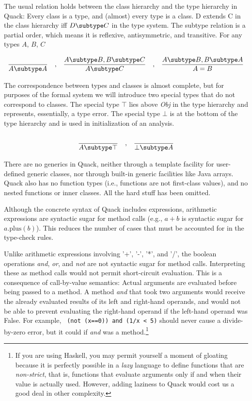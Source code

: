 \documentclass[11pt]{article}
\begin{document}
The usual relation holds between the class hierarchy and the
type hierarchy in Quack:  Every class is a type, and (almost) every type is a
class. D extends C in the class hierarchy iff $D \subtype C$ in the type
system.  The subtype relation is a partial order, which means it is
reflexive, antisymmetric, and transitive.  For any types $A$, $B$, $C$

\[ 
\begin{array}{c@{~~~,~~~}c@{~~~,~~~}c}
 \infrule{}{A \subtype A}  &
 \infrule{A \subtype B, B \subtype C}{A \subtype C}  &
  \infrule{A \subtype B, B \subtype A}{A = B} \\
\end{array}
\]

The correspondence
  between types and classes is almost complete, but for purposes of
  the formal system we will introduce two special types that
  do not correspond to classes.  The special type $\top$ lies 
  above \emph{Obj} in the type hierarchy and represents, essentially,
  a type error.  The special type $\bot$ is at the bottom of the type
  hierarchy and is used in initialization of an analysis.

\[ 
\begin{array}{c@{~~~,~~~}c}
 \infrule{}{A \subtype \top}  &
  \infrule{}{\bot \subtype A}\\
\end{array}
\]


There are no generics in Quack, neither through a template facility
for user-defined generic classes, nor through built-in generic
facilities like Java arrays.  Quack also has no function types (i.e.,
functions are not first-class values), and no nested functions or
inner classes.   All the hard stuff has been omitted. 

Although the concrete syntax of Quack includes expressions, arithmetic
expressions are syntactic sugar for method calls (e.g., $a+b$ is
syntactic sugar for $a.\mbox{plus}(b)$).  This reduces the number of
cases that must be accounted for in the type-check rules.  

Unlike arithmetic expressions involving '+', '-', '*', and '/', 
the boolean operations \emph{and}, \emph{or}, and
\emph{not} are not syntactic sugar for method calls. 
Interpreting these as method calls would not
permit short-circuit evaluation.  This is a consequence of 
call-by-value semantics:  Actual arguments are evaluated before being
passed to a method.   A method \emph{and} that took two arguments
would  receive the already evaluated results of its left and
right-hand operands, and would not be able to prevent evaluating the
right-hand operand if the left-hand operand was False. 
For example, \texttt{ (not (x==0)) and (1/x < 5)} should 
never cause a divide-by-zero error, but it could 
if \emph{and} was a method.\footnote{If you are using Haskell, you may
  permit yourself a moment of gloating because it is perfectly
  possible in a \emph{lazy} language to define functions that are
  \emph{non-strict}, that is, functions that evaluate arguments only
  if and when their value is actually used.  However, adding laziness
  to Quack would cost us a good deal in other complexity.}
\end{document}
